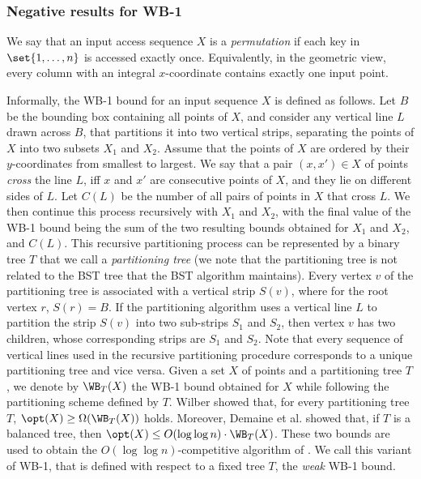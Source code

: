\documentclass{toc}
\begin{document}
\subsubsection{Negative results for WB-1}

We say that an input access sequence $X$ is a \emph{permutation} if each key in $\set{1,\ldots,n}$ is accessed exactly
once. Equivalently, in the geometric view, every column with an integral $x$-coordinate contains exactly one input point.

Informally, the WB-1 bound for an input sequence $X$ is defined as follows. Let $B$ be the bounding box containing all points of $X$, and consider any vertical line $L$ drawn across $B$, that partitions it into two vertical strips, separating the points of $X$ into two subsets $X_{1}$
and $X_{2}$. Assume that the points of $X$ are ordered by their $y$-coordinates from smallest to largest. We say that a pair $(x,x')\in X$ of points \emph{cross} the line $L$, iff $x$ and $x'$ are consecutive points of $X$, and they lie on different sides of $L$. Let $C(L)$ be the number of all pairs of points in $X$ that cross $L$. We then continue this process recursively with $X_1$ and $X_2$, with the final value of the WB-1 bound being the sum of the two resulting bounds obtained for $X_1$ and $X_2$, and $C(L)$.
This recursive partitioning process can be represented by a binary tree $T$ that
we call a \emph{partitioning tree} (we note that the partitioning tree is not related to the BST tree that the BST algorithm maintains). 
Every vertex $v$ of the partitioning tree is associated with a vertical strip $S(v)$, where for the root vertex $r$, $S(r)=B$. If the partitioning algorithm uses a vertical line $L$ to partition the strip $S(v)$ into two sub-strips $S_1$ and $S_2$, then vertex $v$ has two children, whose corresponding strips are $S_1$ and $S_2$. Note that every sequence of vertical lines used in the recursive partitioning procedure corresponds to a unique partitioning tree and vice versa. 
Given a set  $X$ of points and a partitioning tree $T$, we denote  by $\WB_{T}(X)$ the WB-1 bound obtained for $X$ while following the partitioning scheme defined by $T$. Wilber \cite{wilber}
showed that, for every partitioning tree $T$, $\opt(X)\geq \Omega(\WB_{T}(X))$ holds. Moreover,  Demaine et al. \cite{tango} showed that, if $T$ is a balanced tree, then $\opt(X)\le O(\log\log n)\cdot \WB_{T}(X)$. These two bounds are used to obtain the $O(\log\log n)$-competitive algorithm of \cite{tango}. We call this variant of WB-1, that is defined with respect to a fixed tree $T$, the \emph{weak} WB-1 bound. 
\end{document}
